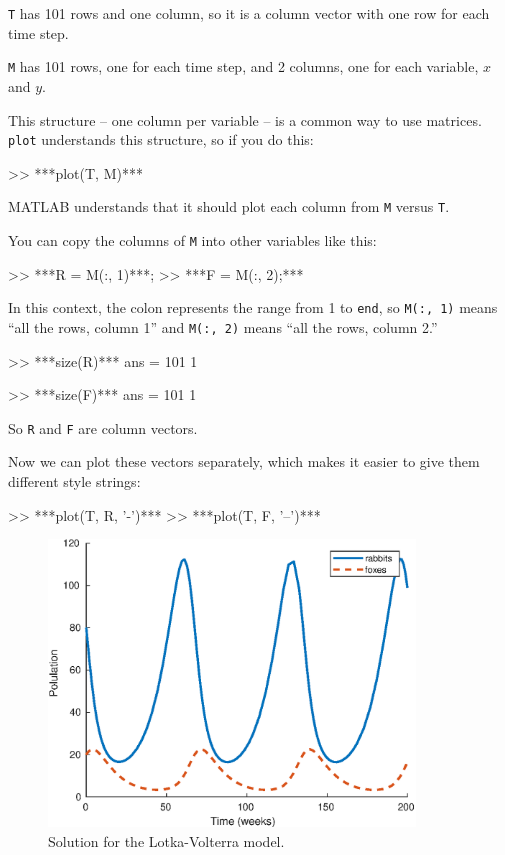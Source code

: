 {\tt T} has 101 rows and one column, so it is a column vector with one row for
each time step.

{\tt M} has 101 rows, one for each time step, and 2 columns, one for each variable,
$x$ and $y$.

This structure -- one column per variable -- is a common way to
use matrices.  {\tt plot} understands this structure, so if you
do this:

\begin{code}
>> ***plot(T, M)***
\end{code}

MATLAB understands that it should plot each column from {\tt M}
versus {\tt T}.


You can copy the columns of {\tt M} into other variables like
this:

\begin{code}
>> ***R = M(:, 1)***;
>> ***F = M(:, 2);***
\end{code}

In this context, the colon represents the range from 1 to {\tt end},
so {\tt M(:, 1)} means ``all the rows, column 1'' and
{\tt M(:, 2)} means ``all the rows, column 2.''

\begin{code}
>> ***size(R)***
ans = 101     1

>> ***size(F)***
ans = 101     1
\end{code}

So {\tt R} and {\tt F} are column vectors.


Now we can plot these vectors separately, which makes it easier to give them different style strings:

\begin{code}
>> ***plot(T, R, '-')***
>> ***plot(T, F, '--')***
\end{code}

\begin{figure}[ht]
\centerline{\includegraphics[height=3in]{book/figs/lotka.eps}}
\caption{Solution for the Lotka-Volterra model.}
\label{fig:lotka}
\end{figure}

